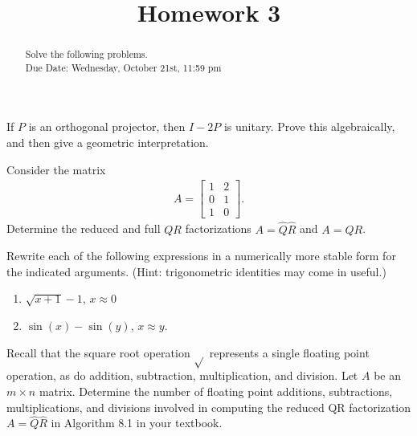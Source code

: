 \documentclass{ximera}
\begin{document}
    \title{Homework 3}
    
    \begin{abstract} Solve the following problems.
    \\
    Due Date: Wednesday, October 21st, 11:59 pm
    \end{abstract}
    \maketitle

\begin{exercise}
    If $P$ is an orthogonal projector, then $I-2P$ is unitary.  Prove this algebraically, and then give a geometric interpretation.    
\end{exercise}

\begin{exercise}
    Consider the matrix 
    \begin{align*}
        A = \begin{bmatrix} 1 & 2 \\ 0 & 1 \\ 1 & 0 \end{bmatrix}.
    \end{align*}
    Determine the reduced and full $QR$ factorizations $A = \hat{Q}\hat{R}$ and $A = QR$.
\end{exercise}

\begin{exercise}
    Rewrite each of the following expressions in a numerically more stable form for the indicated arguments. (Hint: trigonometric identities may come in useful.)
    \begin{enumerate}
        \item $\sqrt{x+1} -1$, $x\approx 0$
        \item $\sin(x) - \sin(y)$, $x \approx y$.
    \end{enumerate}
\end{exercise}

\begin{exercise}
    Recall that the square root operation $\sqrt{}$ represents a single floating point operation, as do addition, subtraction, multiplication, and division.  Let $A$ be an $m \times n$ matrix.  Determine the number of floating point additions, subtractions, multiplications, and divisions involved in computing the reduced QR factorization $A = \hat{Q}\hat{R}$ in Algorithm 8.1 in your textbook.
\end{exercise}
\end{document}
